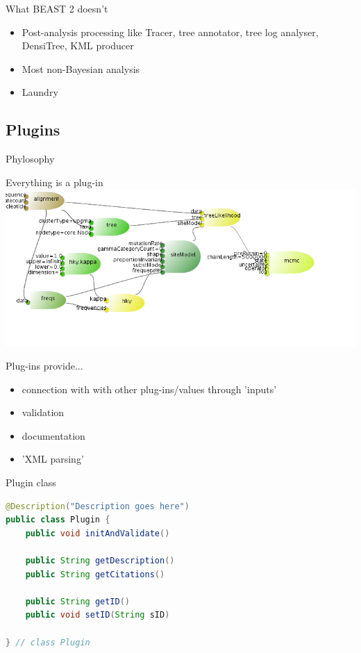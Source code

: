 \documentclass{beamer}
\theoremstyle{definition}
\begin{document}
\begin{frame}{What BEAST 2 doesn't}
\begin{itemize}
\item Post-analysis processing like Tracer, tree annotator, tree log analyser, DensiTree, KML producer
\item Most non-Bayesian analysis
\item Laundry
\end{itemize}

\end{frame}


\subsection{Plugins}

\begin{frame}[containsverbatim]
{Phylosophy}

Everything is a plug-in
\vskip0.5cm
\includegraphics[width=\textwidth]{hkymodel.png}

Plug-ins provide...
\begin{itemize}
\item connection with with other plug-ins/values through 'inputs'
\item validation
\item documentation
\item 'XML parsing'
\end{itemize}
\end{frame}

\begin{frame}[containsverbatim]
{Plugin class}

\begin{lstlisting}[language=java]
@Description("Description goes here")
public class Plugin {
    public void initAndValidate()

    public String getDescription()
    public String getCitations()

    public String getID()
    public void setID(String sID)

} // class Plugin
\end{lstlisting}

\end{frame}
\end{document}
